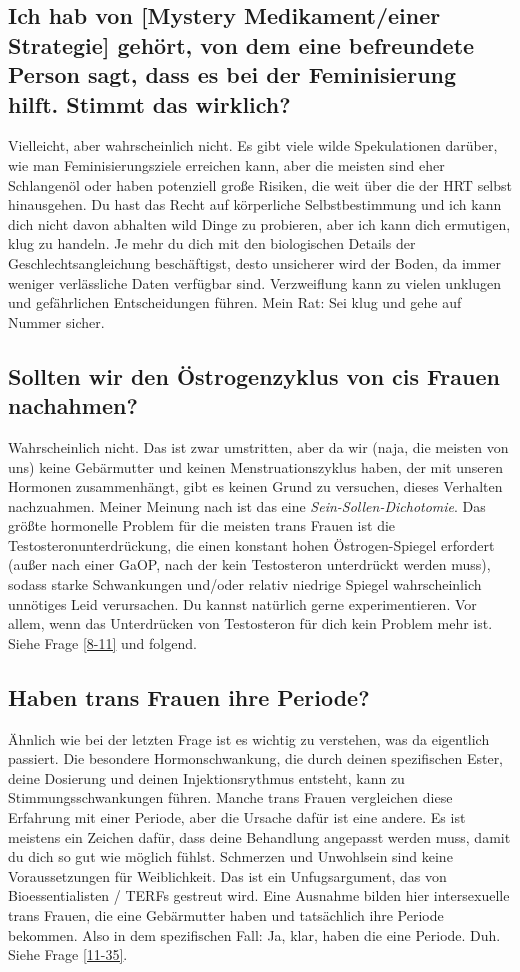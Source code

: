 \documentclass{article}
\begin{document}
\subsection{Ich hab von [Mystery Medikament/einer Strategie] gehört, von dem eine befreundete Person sagt, dass es bei der Feminisierung hilft. Stimmt das wirklich?}

Vielleicht, aber wahrscheinlich nicht. Es gibt viele wilde Spekulationen darüber, wie man Feminisierungsziele erreichen kann, aber die meisten sind eher Schlangenöl oder haben potenziell große Risiken, die weit über die der HRT selbst hinausgehen. Du hast das Recht auf körperliche Selbstbestimmung und ich kann dich nicht davon abhalten wild Dinge zu probieren, aber ich kann dich ermutigen, klug zu handeln. Je mehr du dich mit den biologischen Details der Geschlechtsangleichung beschäftigst, desto unsicherer wird der Boden, da immer weniger verlässliche Daten verfügbar sind. Verzweiflung kann zu vielen unklugen und gefährlichen Entscheidungen führen. Mein Rat: Sei klug und gehe auf Nummer sicher.

\subsection{Sollten wir den Östrogenzyklus von cis Frauen nachahmen?}\label{11-10}

Wahrscheinlich nicht. Das ist zwar umstritten, aber da wir (naja, die meisten von uns) keine Gebärmutter und keinen Menstruationszyklus haben, der mit unseren Hormonen zusammenhängt, gibt es keinen Grund zu versuchen, dieses Verhalten nachzuahmen. Meiner Meinung nach ist das eine \textit{Sein-Sollen-Dichotomie}. Das größte hormonelle Problem für die meisten trans Frauen ist die Testosteronunterdrückung, die einen konstant hohen Östrogen-Spiegel erfordert (außer nach einer GaOP, nach der kein Testosteron unterdrückt werden muss), sodass starke Schwankungen und/oder relativ niedrige Spiegel wahrscheinlich unnötiges Leid verursachen. Du kannst natürlich gerne experimentieren. Vor allem, wenn das Unterdrücken von Testosteron für dich kein Problem mehr ist. Siehe Frage \ref{8-11} und folgend.

\subsection{Haben trans Frauen ihre Periode?}

Ähnlich wie bei der letzten Frage ist es wichtig zu verstehen, was da eigentlich passiert. Die besondere Hormonschwankung, die durch deinen spezifischen Ester, deine Dosierung und deinen Injektionsrythmus entsteht, kann zu Stimmungsschwankungen führen. Manche trans Frauen vergleichen diese Erfahrung mit einer Periode, aber die Ursache dafür ist eine andere. Es ist meistens ein Zeichen dafür, dass deine Behandlung angepasst werden muss, damit du dich so gut wie möglich fühlst. Schmerzen und Unwohlsein sind keine Voraussetzungen für Weiblichkeit. Das ist ein Unfugsargument, das von Bioessentialisten / TERFs gestreut wird. Eine Ausnahme bilden hier intersexuelle trans Frauen, die eine Gebärmutter haben und tatsächlich ihre Periode bekommen. Also in dem spezifischen Fall: Ja, klar, haben die eine Periode. Duh. Siehe Frage \ref{11-35}.
\end{document}

